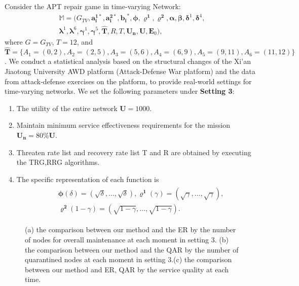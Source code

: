 \documentclass[lettersize,journal]{IEEEtran}
\begin{document}
   Consider the APT repair game in time-varying Network:
   \begin{equation}
	\begin{aligned}
	\mathbb{M}=(G_{TV},\bm{a^{1*}_i},\bm{a^{2*}_i},\bm{b_i}^*,\bm{\phi},\bm{\varrho^1},\bm{\varrho^2},\bm{\alpha},\bm{\beta},\bm{\delta}^1,\bm{\delta}^4,\\
\bm{\lambda}^1,\bm{\lambda}^6,\bm{\gamma}^1,\bm{\gamma}^5,\bm{\hat{T}},
R,T,\bm{U_n},\bm{U},\bm{E}_0),\nonumber
	\end{aligned}
	\end{equation}
  where $G=G_{TV}$, $T = 12$, and
 $\bm{\hat{T}}=\{A_1=(0,2),A_2=(2,5),A_3=(5,6),A_4=(6,9),A_5=(9,11),A_6=(11,12)\}$. 
We conduct a statistical analysis based on the structural changes of the Xi'an Jiaotong University AWD platform (Attack-Defense War platform) and the data from attack-defense exercises on the platform, to provide real-world settings for time-varying networks. We set the following parameters under \textbf{Setting 3}:
 \begin{enumerate}
	\item The utility of the entire network $\bm{U}=1000$.
	\item Maintain minimum service effectiveness requirements for the mission $\bm{U_n} = 80\% \bm{U}$.
	\item Threaten rate list and recovery rate list T and R are obtained by executing the TRG,RRG algorithms.
	\item The specific representation of each function is
        \begin{equation}
        \begin{aligned}
        \begin{aligned}
        &\boldsymbol{\phi}(\delta) =(\sqrt{\delta}, \ldots, \sqrt{\delta}),  \boldsymbol{\varrho^1}(\gamma) =\left(\sqrt{\gamma}, \ldots, \sqrt{\gamma}\right),
        \\
        &\boldsymbol{\varrho^2}(1-\gamma) =(\sqrt{1-\gamma}, \ldots, \sqrt{1-\gamma}).
        \end{aligned}\nonumber
    	\end{aligned}
    	\end{equation}
\end{enumerate}
\begin{figure*}[!t]
\centering
\vspace{-0.5cm}
\hfil
{}
\hfil
{}
\hfil
\caption{(a) the comparison between our method and the ER by the number of nodes for overall maintenance at each moment in setting 3. (b) the comparison between our method and the QAR by the number of quarantined nodes at each moment in setting 3.(c) the comparison between our method and ER, QAR by the service quality at each time.}
\label{a3}
\end{figure*}
\end{document}
